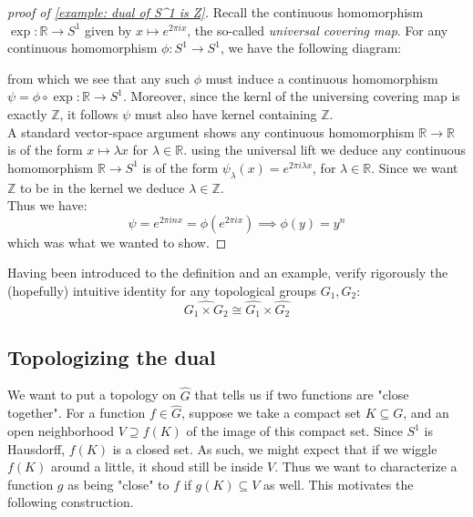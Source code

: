 \documentclass[11pt, x11names]{book}
\newcommand{\zz}{\mathbb{Z}}
\newcommand{\rr}{\mathbb{R}}
\renewcommand{\hat}{\widehat}
\begin{document}
\begin{proof}[proof of \ref{example: dual of S^1 is Z}]
Recall the continuous homomorphism $\exp: \rr \to S^1$ given by $x \mapsto e^{2 \pi i x}$, the so-called \textit{universal covering map}. For any continuous homomorphism $\phi: S^1 \to S^1$, we have the following diagram:
\begin{center}
\end{center} 
from which we see that any such $\phi$ must induce a continuous homomorphism $\psi = \phi \circ \exp: \rr \to S^1$. Moreover, since the kernl of the universing covering map is exactly $\zz$, it follows $\psi$ must also have kernel containing $\zz$. \\
A standard vector-space argument shows any continuous homomorphism  $\rr \to \rr$ is of the form $x \mapsto \lambda x$ for $\lambda \in \rr$. using the universal lift we deduce any continuous homomorphism $\rr \to S^1$ is of the form $\psi_\lambda(x) = e^{2 \pi i \lambda x}$, for $\lambda \in \rr$. Since we want $\zz$ to be in the kernel we deduce $\lambda \in \zz$.\\
Thus we have:
\begin{equation*}
    \psi = e^{2 \pi i n x} = \phi (e^{2 \pi i x}) \implies \phi(y) = y^n
\end{equation*}
which was what we wanted to show.
\end{proof}

\begin{sanitycheck}
Having been introduced to the definition and an example, verify rigorously the (hopefully) intuitive identity for any topological groups $G_1, G_2$:
\begin{equation*}
    \widehat{G_1 \times G_2} \cong \hat{G_1} \times \hat{G_2}
\end{equation*}
\end{sanitycheck}

\subsection{Topologizing the dual}
\label{subsection: Topologizing the dual}

We want to put a topology on $\hat{G}$ that tells us if two functions are "close together".
For a function $f \in \hat{G}$, suppose we take a compact set $K \subseteq G$, and an open 
neighborhood $V \supseteq f(K)$ of the image of this compact set. Since $S^1$ is Hausdorff,
$f(K)$ is a closed set. As such, we might expect that if we wiggle $f(K)$ around a little, it
shoud still be inside $V$. Thus we want to characterize a function $g$ as being "close" to $f$
if $g(K) \subseteq V$ as well. This motivates the following construction.
\end{document}

